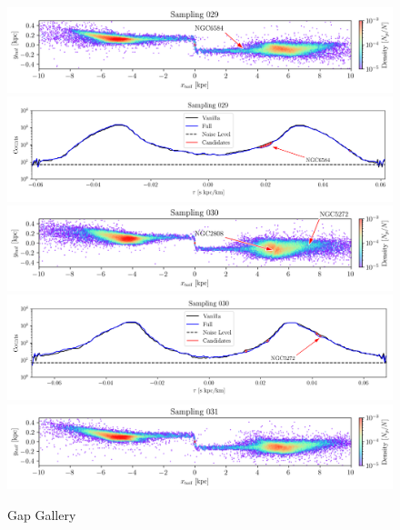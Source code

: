 \documentclass[draft]{aa}
\begin{document}
\begin{appendix}
    \begin{figure}
      \centering      
      \includegraphics[width=\linewidth]{gallery_of_gaps_monte-carlo-029.png}    
      \includegraphics[width=\linewidth]{tau-profile-monte-carlo-029.png}  
      \includegraphics[width=\linewidth]{gallery_of_gaps_monte-carlo-030.png}
      \includegraphics[width=\linewidth]{tau-profile-monte-carlo-030.png}
      \includegraphics[width=\linewidth]{gallery_of_gaps_monte-carlo-031.png}
      \caption{Gap Gallery}
      \label{fig:gallery7}
      \end{figure}        



\end{appendix}
\end{document}

